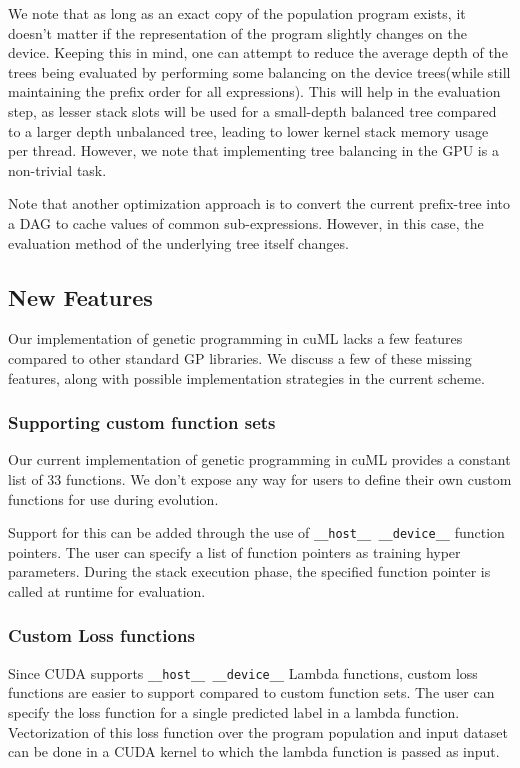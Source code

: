 We note that as long as an exact copy of the population program exists, it doesn't matter if the representation of the program slightly changes on the device. Keeping this in mind, one can attempt to reduce the average depth of the trees being evaluated by performing some balancing on the device trees(while still maintaining the prefix order for all expressions). This will help in the evaluation step, as lesser stack slots will be used for a small-depth balanced tree compared to a larger depth unbalanced tree, leading to lower kernel stack memory usage per thread. However, we note that implementing tree balancing in the GPU is a non-trivial task.

Note that another optimization approach is to convert the current prefix-tree into a DAG to cache values of common sub-expressions. However, in this case, the evaluation method of the underlying tree itself changes. 

\subsection{New Features}
\label{subsec:newfeatures}

Our implementation of genetic programming in cuML lacks a few features compared to other standard GP libraries. We discuss a few of these missing features, along with possible implementation strategies in the current scheme. 

\subsubsection{Supporting custom function sets}
Our current implementation of genetic programming in cuML provides a constant list of $33$ functions. We don't expose any way for users to define their own custom functions for use during evolution. 

Support for this can be added through the use of \lstinline!__host__ __device__! function pointers. The user can specify a list of function pointers as training hyper parameters. During the stack execution phase, the specified function pointer is called at runtime for evaluation.

\subsubsection{Custom Loss functions}

Since CUDA supports \lstinline!__host__ __device__! Lambda functions, custom loss functions are easier to support compared to custom function sets. The user can specify the loss function for a single predicted label in a lambda function. Vectorization of this loss function over the program population and input dataset can be done in a CUDA kernel to which the lambda function is passed as input. 
